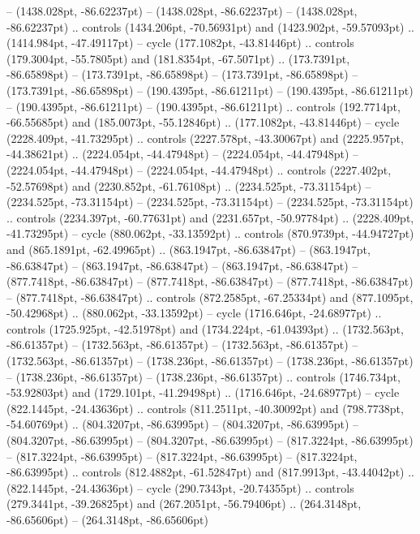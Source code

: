  -- (1438.028pt, -86.62237pt)
 -- (1438.028pt, -86.62237pt)
 -- (1438.028pt, -86.62237pt) .. controls (1434.206pt, -70.56931pt) and (1423.902pt, -59.57093pt) .. (1414.984pt, -47.49117pt) -- cycle
(177.1082pt, -43.81446pt) .. controls (179.3004pt, -55.7805pt) and (181.8354pt, -67.5071pt) .. (173.7391pt, -86.65898pt)
 -- (173.7391pt, -86.65898pt)
 -- (173.7391pt, -86.65898pt)
 -- (173.7391pt, -86.65898pt)
 -- (190.4395pt, -86.61211pt)
 -- (190.4395pt, -86.61211pt)
 -- (190.4395pt, -86.61211pt)
 -- (190.4395pt, -86.61211pt) .. controls (192.7714pt, -66.55685pt) and (185.0073pt, -55.12846pt) .. (177.1082pt, -43.81446pt) -- cycle
(2228.409pt, -41.73295pt) .. controls (2227.578pt, -43.30067pt) and (2225.957pt, -44.38621pt) .. (2224.054pt, -44.47948pt)
 -- (2224.054pt, -44.47948pt)
 -- (2224.054pt, -44.47948pt)
 -- (2224.054pt, -44.47948pt) .. controls (2227.402pt, -52.57698pt) and (2230.852pt, -61.76108pt) .. (2234.525pt, -73.31154pt)
 -- (2234.525pt, -73.31154pt)
 -- (2234.525pt, -73.31154pt)
 -- (2234.525pt, -73.31154pt) .. controls (2234.397pt, -60.77631pt) and (2231.657pt, -50.97784pt) .. (2228.409pt, -41.73295pt) -- cycle
(880.062pt, -33.13592pt) .. controls (870.9739pt, -44.94727pt) and (865.1891pt, -62.49965pt) .. (863.1947pt, -86.63847pt)
 -- (863.1947pt, -86.63847pt)
 -- (863.1947pt, -86.63847pt)
 -- (863.1947pt, -86.63847pt)
 -- (877.7418pt, -86.63847pt)
 -- (877.7418pt, -86.63847pt)
 -- (877.7418pt, -86.63847pt)
 -- (877.7418pt, -86.63847pt) .. controls (872.2585pt, -67.25334pt) and (877.1095pt, -50.42968pt) .. (880.062pt, -33.13592pt) -- cycle
(1716.646pt, -24.68977pt) .. controls (1725.925pt, -42.51978pt) and (1734.224pt, -61.04393pt) .. (1732.563pt, -86.61357pt)
 -- (1732.563pt, -86.61357pt)
 -- (1732.563pt, -86.61357pt)
 -- (1732.563pt, -86.61357pt)
 -- (1738.236pt, -86.61357pt)
 -- (1738.236pt, -86.61357pt)
 -- (1738.236pt, -86.61357pt)
 -- (1738.236pt, -86.61357pt) .. controls (1746.734pt, -53.92803pt) and (1729.101pt, -41.29498pt) .. (1716.646pt, -24.68977pt) -- cycle
(822.1445pt, -24.43636pt) .. controls (811.2511pt, -40.30092pt) and (798.7738pt, -54.60769pt) .. (804.3207pt, -86.63995pt)
 -- (804.3207pt, -86.63995pt)
 -- (804.3207pt, -86.63995pt)
 -- (804.3207pt, -86.63995pt)
 -- (817.3224pt, -86.63995pt)
 -- (817.3224pt, -86.63995pt)
 -- (817.3224pt, -86.63995pt)
 -- (817.3224pt, -86.63995pt) .. controls (812.4882pt, -61.52847pt) and (817.9913pt, -43.44042pt) .. (822.1445pt, -24.43636pt) -- cycle
(290.7343pt, -20.74355pt) .. controls (279.3441pt, -39.26825pt) and (267.2051pt, -56.79406pt) .. (264.3148pt, -86.65606pt)
 -- (264.3148pt, -86.65606pt)
